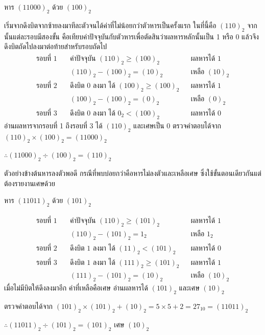 \begin{ex}
\label{ex:bin-divide}
หาร $(11000)_2$ ด้วย $(100)_2$
\end{ex}
\begin{solution}
เริ่มจากดึงบิตจากซ้ายลงมาทีละตัวจนได้ค่าที่ไม่น้อยกว่าตัวหารเป็นครั้งแรก ในที่นี้คือ $(110)_2$ จากนั้นแต่ละรอบมีสองขั้น คือเทียบค่าปัจจุบันกับตัวหารเพื่อตัดสินว่าผลหารหลักนั้นเป็น 1 หรือ 0 แล้วจึงดึงบิตถัดไปลงมาต่อท้ายสำหรับรอบถัดไป
\begin{align*}
\text{รอบที่ 1} \quad & \text{ค่าปัจจุบัน } (110)_2 \geq (100)_2 && \text{ผลหารได้ } 1\\
                      & (110)_2 - (100)_2 = (10)_2 && \text{เหลือ } (10)_2\\[0.4em]
\text{รอบที่ 2} \quad & \text{ดึงบิต } 0 \text{ ลงมา ได้ } (100)_2 \geq (100)_2 && \text{ผลหารได้ } 1\\
                      & (100)_2 - (100)_2 = (0)_2 && \text{เหลือ } (0)_2\\[0.4em]
\text{รอบที่ 3} \quad & \text{ดึงบิต } 0 \text{ ลงมา ได้ } 0_2 < (100)_2 && \text{ผลหารได้ } 0
\end{align*}
อ่านผลหารจากรอบที่ 1 ถึงรอบที่ 3 ได้ $(110)_2$ และเศษเป็น $0$ ตรวจคำตอบได้จาก $(110)_2 \times (100)_2 = (11000)_2$

$\therefore (11000)_2 \div (100)_2 = (110)_2$ \solhere
\end{solution}

ตัวอย่างข้างต้นหารลงตัวพอดี กรณีที่พบบ่อยกว่าคือหารไม่ลงตัวและเหลือเศษ ซึ่งใช้ขั้นตอนเดียวกันแต่ต้องรายงานเศษด้วย

\begin{ex}
\label{ex:bin-divide-remainder}
หาร $(11011)_2$ ด้วย $(101)_2$
\end{ex}
\begin{solution}
\begin{align*}
\text{รอบที่ 1} \quad & \text{ค่าปัจจุบัน } (110)_2 \geq (101)_2 && \text{ผลหารได้ } 1\\
                      & (110)_2 - (101)_2 = 1_2 && \text{เหลือ } 1_2\\[0.4em]
\text{รอบที่ 2} \quad & \text{ดึงบิต } 1 \text{ ลงมา ได้ } (11)_2 < (101)_2 && \text{ผลหารได้ } 0\\[0.4em]
\text{รอบที่ 3} \quad & \text{ดึงบิต } 1 \text{ ลงมา ได้ } (111)_2 \geq (101)_2 && \text{ผลหารได้ } 1\\
                      & (111)_2 - (101)_2 = (10)_2 && \text{เหลือ } (10)_2
\end{align*}
เมื่อไม่มีบิตให้ดึงลงมาอีก ค่าที่เหลือคือเศษ อ่านผลหารได้ $(101)_2$ และเศษ $(10)_2$

ตรวจคำตอบได้จาก $(101)_2 \times (101)_2 + (10)_2 = 5 \times 5 + 2 = 27_{10} = (11011)_2$

$\therefore (11011)_2 \div (101)_2 = (101)_2$ เศษ $(10)_2$ \solhere
\end{solution}


